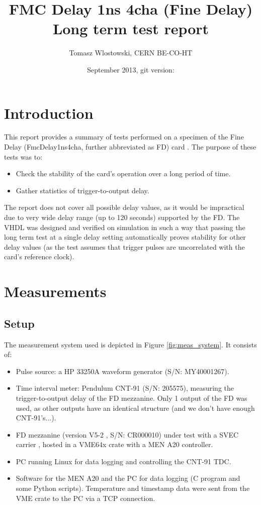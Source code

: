 \documentclass{article}
\title{ FMC Delay 1ns 4cha (Fine Delay) \\ \large{Long term test report}}
\author{Tomasz Wlostowski, CERN BE-CO-HT}
\date{September 2013, git version: \ttfamily{ddbf6ec}}
\begin{document}
   \maketitle
\section{Introduction}
This report provides a summary of tests performed on a specimen of the Fine Delay (FmcDelay1ns4cha, further abbreviated as FD) card \cite{homepage}.
The purpose of these tests was to:
\begin{itemize}
\item Check the stability of the card's operation over a long period of time.
\item Gather statistics of trigger-to-output delay.
\end{itemize}

The report does not cover all possible delay values, as it would be impractical due to very wide delay range (up to 120 seconds) supported by the FD. The VHDL was designed and verified on simulation in such a way that passing the long term test at a single delay setting automatically proves stability for other delay values (as the test assumes that trigger pulses are uncorrelated with the card's reference clock).

\section{Measurements}
\subsection{Setup}
The measurement system used is depicted in Figure \ref{fig:meas_system}. It consists of:


\begin{itemize}
\item Pulse source: a HP 33250A waveform generator (S/N: MY40001267).
\item Time interval meter: Pendulum CNT-91 \cite{cnt91} (S/N: 205575), measuring the trigger-to-output delay of the FD mezzanine. Only 1 output of the FD was used, as other outputs have an identical structure (and we don't have enough CNT-91's...).
\item FD mezzanine (version V5-2 \cite{edms}, S/N: CR000010) under test with a SVEC carrier \cite{svec}, hosted in a VME64x crate with a MEN A20 controller.
\item PC running Linux for data logging and controlling the CNT-91 TDC.
\item Software for the MEN A20 and the PC for data logging (C program and some Python scripts). Temperature and timestamp data were sent from the VME crate to the PC via a TCP connection.
\end{itemize}
\end{document}
